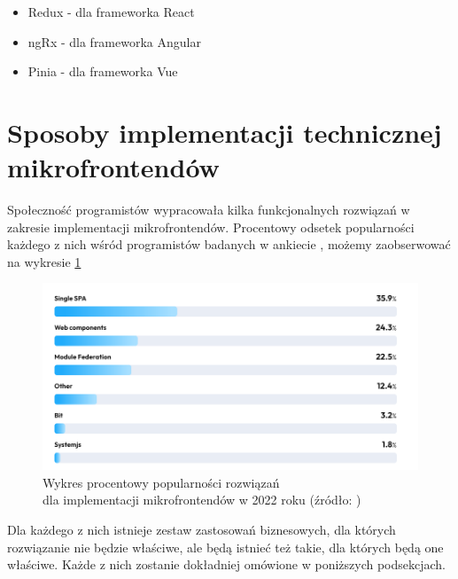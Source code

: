 \documentclass{SGGW-thesis}
\begin{document}
\begin{itemize}
  \item Redux - dla frameworka React
  \item ngRx - dla frameworka Angular
  \item Pinia - dla frameworka Vue
\end{itemize}

\section{Sposoby implementacji technicznej mikrofrontendów}
Społeczność programistów wypracowała kilka funkcjonalnych rozwiązań w zakresie implementacji mikrofrontendów. Procentowy odsetek popularności każdego z nich wśród programistów badanych w ankiecie \cite{tsh_2022}, możemy zaobserwować na wykresie \cref{fig:tsh_frontend_implementations}

\begin{figure}[h]
	\centering
	\captionsetup{justification=centering}
	\includegraphics[width=\textwidth]{frontend_implementations_by_percent.png}
	\caption[Wykres procentowy popularności rozwiązań dla implementacji mikrofrontendów w 2022 roku]{Wykres procentowy popularności rozwiązań \\ dla implementacji mikrofrontendów w 2022 roku (źródło: \cite{tsh_2022})}
	\label{fig:tsh_frontend_implementations}
\end{figure}

Dla każdego z nich istnieje zestaw zastosowań biznesowych, dla których rozwiązanie nie będzie właściwe, ale będą istnieć też takie, dla których będą one właściwe. Każde z nich zostanie dokładniej omówione w poniższych podsekcjach.
\end{document}
